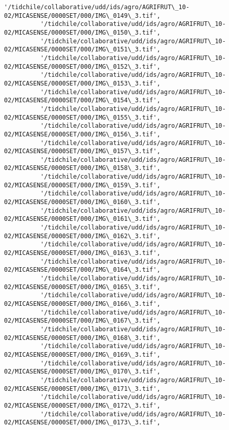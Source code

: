 \documentclass[11pt]{article}
\begin{document}
\begin{Verbatim}[commandchars=\\\{\}]
          '/tidchile/collaborative/udd/ids/agro/AGRIFRUT\_10-02/MICASENSE/0000SET/000/IMG\_0149\_3.tif',
          '/tidchile/collaborative/udd/ids/agro/AGRIFRUT\_10-02/MICASENSE/0000SET/000/IMG\_0150\_3.tif',
          '/tidchile/collaborative/udd/ids/agro/AGRIFRUT\_10-02/MICASENSE/0000SET/000/IMG\_0151\_3.tif',
          '/tidchile/collaborative/udd/ids/agro/AGRIFRUT\_10-02/MICASENSE/0000SET/000/IMG\_0152\_3.tif',
          '/tidchile/collaborative/udd/ids/agro/AGRIFRUT\_10-02/MICASENSE/0000SET/000/IMG\_0153\_3.tif',
          '/tidchile/collaborative/udd/ids/agro/AGRIFRUT\_10-02/MICASENSE/0000SET/000/IMG\_0154\_3.tif',
          '/tidchile/collaborative/udd/ids/agro/AGRIFRUT\_10-02/MICASENSE/0000SET/000/IMG\_0155\_3.tif',
          '/tidchile/collaborative/udd/ids/agro/AGRIFRUT\_10-02/MICASENSE/0000SET/000/IMG\_0156\_3.tif',
          '/tidchile/collaborative/udd/ids/agro/AGRIFRUT\_10-02/MICASENSE/0000SET/000/IMG\_0157\_3.tif',
          '/tidchile/collaborative/udd/ids/agro/AGRIFRUT\_10-02/MICASENSE/0000SET/000/IMG\_0158\_3.tif',
          '/tidchile/collaborative/udd/ids/agro/AGRIFRUT\_10-02/MICASENSE/0000SET/000/IMG\_0159\_3.tif',
          '/tidchile/collaborative/udd/ids/agro/AGRIFRUT\_10-02/MICASENSE/0000SET/000/IMG\_0160\_3.tif',
          '/tidchile/collaborative/udd/ids/agro/AGRIFRUT\_10-02/MICASENSE/0000SET/000/IMG\_0161\_3.tif',
          '/tidchile/collaborative/udd/ids/agro/AGRIFRUT\_10-02/MICASENSE/0000SET/000/IMG\_0162\_3.tif',
          '/tidchile/collaborative/udd/ids/agro/AGRIFRUT\_10-02/MICASENSE/0000SET/000/IMG\_0163\_3.tif',
          '/tidchile/collaborative/udd/ids/agro/AGRIFRUT\_10-02/MICASENSE/0000SET/000/IMG\_0164\_3.tif',
          '/tidchile/collaborative/udd/ids/agro/AGRIFRUT\_10-02/MICASENSE/0000SET/000/IMG\_0165\_3.tif',
          '/tidchile/collaborative/udd/ids/agro/AGRIFRUT\_10-02/MICASENSE/0000SET/000/IMG\_0166\_3.tif',
          '/tidchile/collaborative/udd/ids/agro/AGRIFRUT\_10-02/MICASENSE/0000SET/000/IMG\_0167\_3.tif',
          '/tidchile/collaborative/udd/ids/agro/AGRIFRUT\_10-02/MICASENSE/0000SET/000/IMG\_0168\_3.tif',
          '/tidchile/collaborative/udd/ids/agro/AGRIFRUT\_10-02/MICASENSE/0000SET/000/IMG\_0169\_3.tif',
          '/tidchile/collaborative/udd/ids/agro/AGRIFRUT\_10-02/MICASENSE/0000SET/000/IMG\_0170\_3.tif',
          '/tidchile/collaborative/udd/ids/agro/AGRIFRUT\_10-02/MICASENSE/0000SET/000/IMG\_0171\_3.tif',
          '/tidchile/collaborative/udd/ids/agro/AGRIFRUT\_10-02/MICASENSE/0000SET/000/IMG\_0172\_3.tif',
          '/tidchile/collaborative/udd/ids/agro/AGRIFRUT\_10-02/MICASENSE/0000SET/000/IMG\_0173\_3.tif',

\end{Verbatim}
\end{document}
